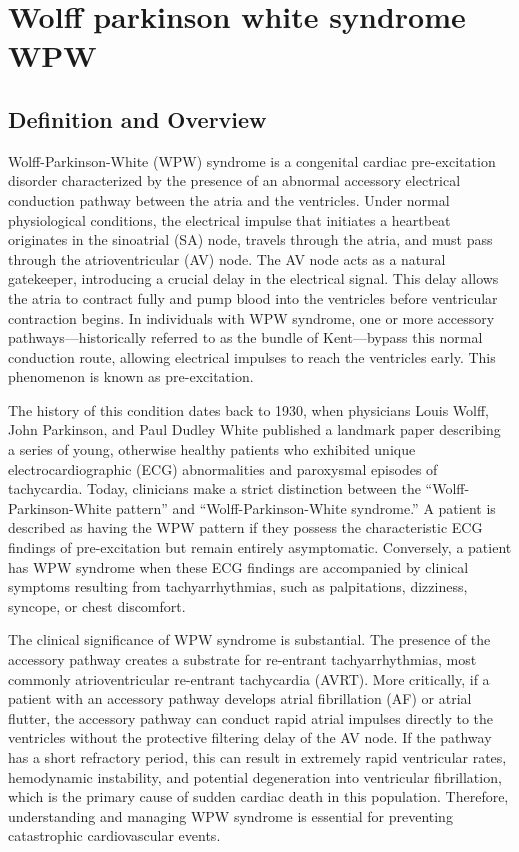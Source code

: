 \chapter{Wolff parkinson white syndrome WPW}

\section*{Definition and Overview}
Wolff-Parkinson-White (WPW) syndrome is a congenital cardiac pre-excitation disorder characterized by the presence of an abnormal accessory electrical conduction pathway between the atria and the ventricles. Under normal physiological conditions, the electrical impulse that initiates a heartbeat originates in the sinoatrial (SA) node, travels through the atria, and must pass through the atrioventricular (AV) node. The AV node acts as a natural gatekeeper, introducing a crucial delay in the electrical signal. This delay allows the atria to contract fully and pump blood into the ventricles before ventricular contraction begins. In individuals with WPW syndrome, one or more accessory pathways---historically referred to as the bundle of Kent---bypass this normal conduction route, allowing electrical impulses to reach the ventricles early. This phenomenon is known as pre-excitation.

The history of this condition dates back to 1930, when physicians Louis Wolff, John Parkinson, and Paul Dudley White published a landmark paper describing a series of young, otherwise healthy patients who exhibited unique electrocardiographic (ECG) abnormalities and paroxysmal episodes of tachycardia. Today, clinicians make a strict distinction between the ``Wolff-Parkinson-White pattern'' and ``Wolff-Parkinson-White syndrome.'' A patient is described as having the WPW pattern if they possess the characteristic ECG findings of pre-excitation but remain entirely asymptomatic. Conversely, a patient has WPW syndrome when these ECG findings are accompanied by clinical symptoms resulting from tachyarrhythmias, such as palpitations, dizziness, syncope, or chest discomfort.

The clinical significance of WPW syndrome is substantial. The presence of the accessory pathway creates a substrate for re-entrant tachyarrhythmias, most commonly atrioventricular re-entrant tachycardia (AVRT). More critically, if a patient with an accessory pathway develops atrial fibrillation (AF) or atrial flutter, the accessory pathway can conduct rapid atrial impulses directly to the ventricles without the protective filtering delay of the AV node. If the pathway has a short refractory period, this can result in extremely rapid ventricular rates, hemodynamic instability, and potential degeneration into ventricular fibrillation, which is the primary cause of sudden cardiac death in this population. Therefore, understanding and managing WPW syndrome is essential for preventing catastrophic cardiovascular events.

